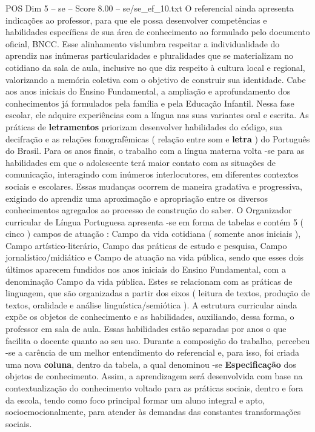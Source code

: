\begin{textsample}{POS Dim 5 – se – Score 8.00 – se/se\_ef\_10.txt}
O referencial ainda apresenta indicações ao professor, para que ele possa desenvolver competências e habilidades específicas de sua área de conhecimento ao formulado pelo documento oficial, BNCC.
Esse alinhamento vislumbra respeitar a individualidade do aprendiz nas inúmeras particularidades e pluralidades que se materializam no cotidiano da sala de aula, inclusive no que diz respeito à cultura local e regional, valorizando a memória coletiva com o objetivo de construir sua identidade.
Cabe aos anos iniciais do Ensino Fundamental, a ampliação e aprofundamento dos conhecimentos já formulados pela família e pela Educação Infantil.
Nessa fase escolar, ele adquire experiências com a língua nas suas variantes oral e escrita.
As práticas de \textbf{letramentos} priorizam desenvolver habilidades do código, sua decifração e as relações fonografêmicas ( relação entre som e \textbf{letra} ) do Português do Brasil.
Para os anos finais, o trabalho com a língua materna volta -se para as habilidades em que o adolescente terá maior contato com as situações de comunicação, interagindo com inúmeros interlocutores, em diferentes contextos sociais e escolares.
Essas mudanças ocorrem de maneira gradativa e progressiva, exigindo do aprendiz uma aproximação e apropriação entre os diversos conhecimentos agregados ao processo de construção do saber.
O Organizador curricular de Língua Portuguesa apresenta -se em forma de tabelas e contém 5 ( cinco ) campos de atuação : Campo da vida cotidiana ( somente anos iniciais ), Campo artístico-literário, Campo das práticas de estudo e pesquisa, Campo jornalístico/midiático e Campo de atuação na vida pública, sendo que esses dois últimos aparecem fundidos nos anos iniciais do Ensino Fundamental, com a denominação Campo da vida pública.
Estes se relacionam com as práticas de linguagem, que são organizadas a partir dos eixos ( leitura de textos, produção de textos, oralidade e análise linguística/semiótica ).
A estrutura curricular ainda expõe os objetos de conhecimento e as habilidades, auxiliando, dessa forma, o professor em sala de aula.
Essas habilidades estão separadas por anos o que facilita o docente quanto ao seu uso.
Durante a composição do trabalho, percebeu -se a carência de um melhor entendimento do referencial e, para isso, foi criada uma nova \textbf{coluna}, dentro da tabela, a qual denominou -se \textbf{Especificação} dos objetos de conhecimento.
Assim, a aprendizagem será desenvolvida com base na contextualização do conhecimento voltado para as práticas sociais, dentro e fora da escola, tendo como foco principal formar um aluno integral e apto, socioemocionalmente, para atender às demandas das constantes transformações sociais.

\end{textsample}
